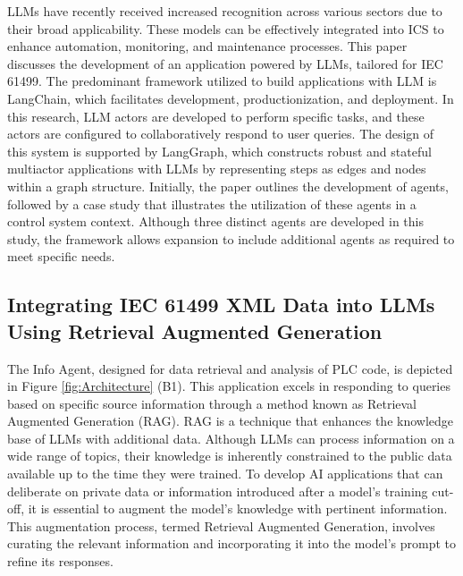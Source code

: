 \documentclass[conference]{IEEEtran}
\begin{document}
LLMs have recently received increased recognition across various sectors due to their broad applicability. These models can be effectively integrated into ICS to enhance automation, monitoring, and maintenance processes. This paper discusses the development of an application powered by LLMs, tailored for IEC 61499. The predominant framework utilized to build applications with LLM is LangChain, which facilitates development, productionization, and deployment. In this research, LLM actors are developed to perform specific tasks, and these actors are configured to collaboratively respond to user queries. The design of this system is supported by LangGraph, which constructs robust and stateful multiactor applications with LLMs by representing steps as edges and nodes within a graph structure. Initially, the paper outlines the development of agents, followed by a case study that illustrates the utilization of these agents in a control system context. Although three distinct agents are developed in this study, the framework allows expansion to include additional agents as required to meet specific needs.

\subsection{Integrating IEC 61499 XML Data into LLMs Using Retrieval Augmented Generation}

The Info Agent, designed for data retrieval and analysis of PLC code, is depicted in Figure \ref{fig:Architecture} (B1). This application excels in responding to queries based on specific source information through a method known as Retrieval Augmented Generation (RAG). RAG is a technique that enhances the knowledge base of LLMs with additional data. Although LLMs can process information on a wide range of topics, their knowledge is inherently constrained to the public data available up to the time they were trained. To develop AI applications that can deliberate on private data or information introduced after a model's training cut-off, it is essential to augment the model's knowledge with pertinent information. This augmentation process, termed Retrieval Augmented Generation, involves curating the relevant information and incorporating it into the model's prompt to refine its responses.
\end{document}
